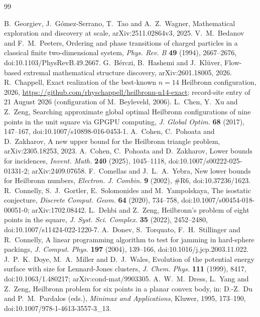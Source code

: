 \documentclass[11pt]{amsart}
\theoremstyle{definition}
\begin{document}
\begin{thebibliography}{99}

 B.~Georgiev, J.~G\'omez-Serrano, T.~Tao and A.~Z.~Wagner, Mathematical exploration and discovery at scale, arXiv:2511.02864v3, 2025.
 V.~M.~Bedanov and F.~M.~Peeters, Ordering and phase transitions of charged particles in a classical finite two-dimensional system, \emph{Phys. Rev. B} \textbf{49} (1994), 2667--2676, doi:10.1103/PhysRevB.49.2667.
 G.~B\'erczi, B.~Hashemi and J.~Kl\"uver, Flow-based extremal mathematical structure discovery, arXiv:2601.18005, 2026.
 R.~Chappell, Exact realization of the best-known $n=14$ Heilbronn configuration, 2026, \url{https://github.com/rhyschappell/heilbronn-n14-exact}; record-site entry of 21 August 2026 (configuration of M.~Beyleveld, 2006).
 L.~Chen, Y.~Xu and Z.~Zeng, Searching approximate global optimal Heilbronn configurations of nine points in the unit square via GPGPU computing, \emph{J. Global Optim.} \textbf{68} (2017), 147--167, doi:10.1007/s10898-016-0453-1.
 A.~Cohen, C.~Pohoata and D.~Zakharov, A new upper bound for the Heilbronn triangle problem, arXiv:2305.18253, 2023.
 A.~Cohen, C.~Pohoata and D.~Zakharov, Lower bounds for incidences, \emph{Invent. Math.} \textbf{240} (2025), 1045--1118, doi:10.1007/s00222-025-01331-2; arXiv:2409.07658.
 F.~Comellas and J.~L.~A.~Yebra, New lower bounds for Heilbronn numbers, \emph{Electron. J. Combin.} \textbf{9} (2002), \#R6, doi:10.37236/1623.
 R.~Connelly, S.~J.~Gortler, E.~Solomonides and M.~Yampolskaya, The isostatic conjecture, \emph{Discrete Comput. Geom.} \textbf{64} (2020), 734--758, doi:10.1007/s00454-018-00051-0; arXiv:1702.08442.
 L.~Dehbi and Z.~Zeng, Heilbronn's problem of eight points in the square, \emph{J. Syst. Sci. Complex.} \textbf{35} (2022), 2452--2480, doi:10.1007/s11424-022-1220-7.
 A.~Donev, S.~Torquato, F.~H.~Stillinger and R.~Connelly, A linear programming algorithm to test for jamming in hard-sphere packings, \emph{J. Comput. Phys.} \textbf{197} (2004), 139--166, doi:10.1016/j.jcp.2003.11.022.
 J.~P.~K.~Doye, M.~A.~Miller and D.~J.~Wales, Evolution of the potential energy surface with size for Lennard-Jones clusters, \emph{J. Chem. Phys.} \textbf{111} (1999), 8417, doi:10.1063/1.480217; arXiv:cond-mat/9903305.
 A.~W.~M.~Dress, L.~Yang and Z.~Zeng, Heilbronn problem for six points in a planar convex body, in: D.-Z.~Du and P.~M.~Pardalos (eds.), \emph{Minimax and Applications}, Kluwer, 1995, 173--190, doi:10.1007/978-1-4613-3557-3\_13.

\end{thebibliography}
\end{document}
